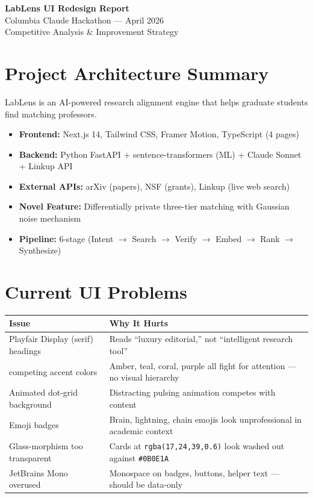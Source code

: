 \documentclass[11pt,letterpaper]{article}
\begin{document}
\begin{center}
    {\LARGE\bfseries LabLens UI Redesign Report}\\[0.5em]
    {\large Columbia Claude Hackathon --- April 2026}\\[0.3em]
    {\normalsize Competitive Analysis \& Improvement Strategy}
\end{center}

\vspace{1em}

\section{Project Architecture Summary}

LabLens is an AI-powered research alignment engine that helps graduate students find matching professors.

\begin{itemize}[nosep]
    \item \textbf{Frontend:} Next.js 14, Tailwind CSS, Framer Motion, TypeScript (4 pages)
    \item \textbf{Backend:} Python FastAPI + sentence-transformers (ML) + Claude Sonnet + Linkup API
    \item \textbf{External APIs:} arXiv (papers), NSF (grants), Linkup (live web search)
    \item \textbf{Novel Feature:} Differentially private three-tier matching with Gaussian noise mechanism
    \item \textbf{Pipeline:} 6-stage (Intent $\rightarrow$ Search $\rightarrow$ Verify $\rightarrow$ Embed $\rightarrow$ Rank $\rightarrow$ Synthesize)
\end{itemize}

\section{Current UI Problems}

\begin{longtable}{>{\raggedright\arraybackslash}p{4.5cm} p{9cm}}
\toprule
\textbf{Issue} & \textbf{Why It Hurts} \\
\midrule
Playfair Display (serif) headings & Reads ``luxury editorial,'' not ``intelligent research tool'' \\
4 competing accent colors & Amber, teal, coral, purple all fight for attention --- no visual hierarchy \\
Animated dot-grid background & Distracting pulsing animation competes with content \\
Emoji badges & Brain, lightning, chain emojis look unprofessional in academic context \\
Glass-morphism too transparent & Cards at \texttt{rgba(17,24,39,0.6)} look washed out against \texttt{\#0B0E1A} \\
JetBrains Mono overused & Monospace on badges, buttons, helper text --- should be data-only \\
\bottomrule
\end{longtable}
\end{document}
